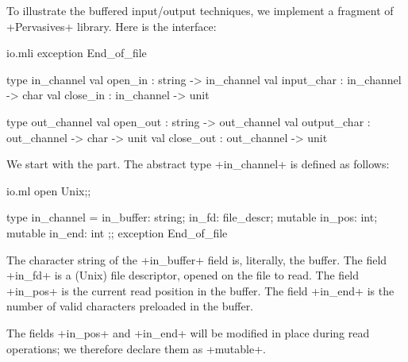 To illustrate the buffered input/output techniques, we implement a fragment
of {\ocaml} \ml+Pervasives+ library. Here is the interface:
%
\begin{listingcodefile}{io.mli}
exception End_of_file

type in_channel
val open_in : string -> in_channel
val input_char : in_channel -> char
val close_in : in_channel -> unit

type out_channel
val open_out : string -> out_channel
val output_char : out_channel -> char -> unit
val close_out : out_channel -> unit
\end{listingcodefile}
%
We start with the  part. The abstract type 
\ml+in_channel+ is defined as follows: 
%
\begin{listingcodefile}{io.ml}
open Unix;;

type in_channel =
  { in_buffer: string;
    in_fd: file_descr;
    mutable in_pos: int;
    mutable in_end: int };;
exception End_of_file
\end{listingcodefile}
%
The character string of the \ml+in_buffer+ field is, literally, the
buffer.  The field \ml+in_fd+ is a (Unix) file descriptor, opened on
the file to read. The field \ml+in_pos+ is the current read position
in the buffer.  The field \ml+in_end+ is the number of valid
characters preloaded in the buffer.
%
\begin{myimage}[width="85\%"]
\end{myimage}
The fields \ml+in_pos+ and \ml+in_end+ will be modified in place during 
read operations; we therefore declare them as \ml+mutable+.

